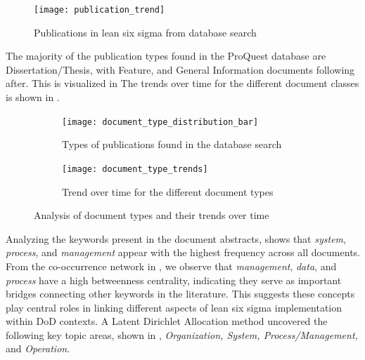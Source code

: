 \documentclass{article}
\begin{document}
		\begin{figure}[htbp]
			\centering
			\texttt{[image: publication\_trend]}
			\caption{Publications in lean six sigma from database search}
			\label{fig:publication_trend}
		\end{figure}

		The majority of the publication types found in the ProQuest database are Dissertation/Thesis, with Feature, and General Information documents following after.
		This is visualized in 
		The trends over time for the different document classes is shown in .

		\begin{figure}[htbp]
			\centering
			\begin{subfigure}[b]{0.48\textwidth}
				\centering
				\texttt{[image: document\_type\_distribution\_bar]}
				\caption{Types of publications found in the database search}
				\label{fig:document_type}
			\end{subfigure}
			\hfill
			\begin{subfigure}[b]{0.48\textwidth}
				\centering
				\texttt{[image: document\_type\_trends]}
				\caption{Trend over time for the different document types}
				\label{fig:document_type_trend}
			\end{subfigure}
			\caption{Analysis of document types and their trends over time}
			\label{fig:document_analysis}
		\end{figure}


		Analyzing the keywords present in the document abstracts,  shows that \textit{system}, \textit{process}, and \textit{management} appear with the highest frequency across all documents.
		From the co-occurrence network in , we observe that \textit{management}, \textit{data}, and \textit{process} have a high betweenness centrality, indicating they serve as important bridges connecting other keywords in the literature. This suggests these concepts play central roles in linking different aspects of lean six sigma implementation within DoD contexts.
		A Latent Dirichlet Allocation method uncovered the following key topic areas, shown in , \textit{Organization, System, Process/Management,} and \textit{Operation}.
\end{document}
